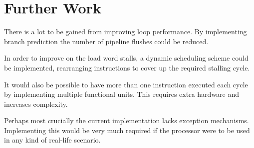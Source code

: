 \section{Further Work}
There is a lot to be gained from improving loop performance.
By implementing branch prediction the number of pipeline flushes could be reduced.

In order to improve on the load word stalls,
a dynamic scheduling scheme could be implemented,
rearranging instructions to cover up the required stalling cycle.

It would also be possible to have more than one instruction executed each cycle
by implementing multiple functional units.
This requires extra hardware and increases complexity.

Perhaps most crucially the current implementation lacks exception mechanisms.
Implementing this would be very much required if the processor were to be used in any kind of real-life scenario.

